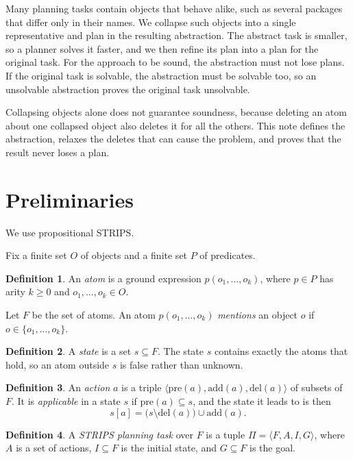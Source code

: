 \documentclass{article}
\theoremstyle{definition}
\newtheorem{definition}{Definition}
\theoremstyle{plain}
\theoremstyle{definition}
\begin{document}
Many planning tasks contain objects that behave alike, such as several packages that differ only in their names. We collapse such objects into a single representative and plan in the resulting abstraction. The abstract task is smaller, so a planner solves it faster, and we then refine its plan into a plan for the original task. For the approach to be sound, the abstraction must not lose plans. If the original task is solvable, the abstraction must be solvable too, so an unsolvable abstraction proves the original task unsolvable.

Collapsing objects alone does not guarantee soundness, because deleting an atom about one collapsed object also deletes it for all the others. This note defines the abstraction, relaxes the deletes that can cause the problem, and proves that the result never loses a plan.

\section{Preliminaries}\label{sec:prelim}

We use propositional STRIPS.

Fix a finite set $O$ of objects and a finite set $P$ of predicates.

\begin{definition}
An \emph{atom} is a ground expression $p(o_1,\dots,o_k)$, where $p \in P$ has arity $k \geq 0$ and $o_1,\dots,o_k \in O$.
\end{definition}

Let $F$ be the set of atoms. An atom $p(o_1,\dots,o_k)$ \emph{mentions} an object $o$ if $o \in \{o_1,\dots,o_k\}$.

\begin{definition}
A \emph{state} is a set $s \subseteq F$. The state $s$ contains exactly the atoms that hold, so an atom outside $s$ is false rather than unknown.
\end{definition}

\begin{definition}\label{def:action}
An \emph{action} $a$ is a triple $\langle \mathrm{pre}(a), \mathrm{add}(a), \mathrm{del}(a) \rangle$ of subsets of $F$. It is \emph{applicable} in a state $s$ if $\mathrm{pre}(a) \subseteq s$, and the state it leads to is then
\[
  s[a] = \bigl(s \setminus \mathrm{del}(a)\bigr) \cup \mathrm{add}(a).
\]
\end{definition}

\begin{definition}
A \emph{STRIPS planning task} over $F$ is a tuple $\Pi = \langle F,A,I,G\rangle$, where $A$ is a set of actions, $I \subseteq F$ is the initial state, and $G \subseteq F$ is the goal.
\end{definition}
\end{document}
